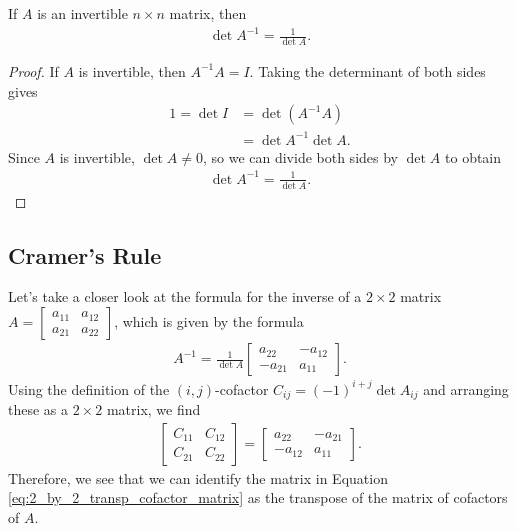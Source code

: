 \documentclass[12pt,letterpaper,reqno]{article}
\numberwithin{equation}{section}
\begin{document}
\begin{thm}
	If $A$ is an invertible $n \times n$ matrix, then
	\begin{align*}
		\det A^{-1}=\frac{1}{\det A}.
	\end{align*}
\end{thm}

\begin{proof}
	If $A$ is invertible, then $A^{-1}A=I$. Taking the determinant of both sides gives
	\begin{align*}
		1=\det I&=\det (A^{-1}A) \\
		&=\det A^{-1}\det A.
	\end{align*}
	Since $A$ is invertible, $\det A \neq 0$, so we can divide both sides by $\det A$ to obtain
	\begin{align*}
		\det A^{-1}=\frac{1}{\det A}.
	\end{align*}
\end{proof}

\subsection{Cramer's Rule}\label{sec:cramer}
Let's take a closer look at the formula for the inverse of a $2 \times 2$ matrix $A=\begin{bmatrix}
	a_{11} & a_{12} \\ a_{21} & a_{22}
\end{bmatrix}$, which is given by the formula
\begin{align}\label{eq:2_by_2_transp_cofactor_matrix}
	A^{-1}=\frac{1}{\det A}\begin{bmatrix}
		a_{22} & -a_{12} \\
		-a_{21} & a_{11}
	\end{bmatrix}.
\end{align}
Using the definition of the $(i,j)$-cofactor $C_{ij}=(-1)^{i+j}\det A_{ij}$ and arranging these as a $2 \times 2$ matrix, we find
\begin{align*}
	\begin{bmatrix}
		C_{11} & C_{12} \\
		C_{21} & C_{22}
	\end{bmatrix}=\begin{bmatrix}
		a_{22} & -a_{21} \\
		-a_{12} & a_{11}
	\end{bmatrix}.
\end{align*} 
Therefore, we see that we can identify the matrix in Equation \eqref{eq:2_by_2_transp_cofactor_matrix} as the transpose of the matrix of cofactors of $A$.  
\end{document}
